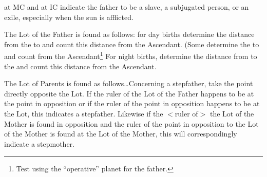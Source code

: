 \Saturn\xspace at MC and \Jupiter\xspace at IC indicate the
father to be a slave, a subjugated person, or an exile, especially when the sun is afflicted.

The Lot of the Father is found as follows: for day births determine the distance from the \Sun\xspace to \Saturn\xspace and count this distance from the Ascendant. (Some determine the \Sun\xspace to \Jupiter\xspace and count from the Ascendant\footnote{Test using the ``operative'' planet for the father.} For night births, determine the distance from \Venus\xspace to the \Moon\xspace and count this distance from the Ascendant. 

The Lot of Parents is found as follows\ldots Concerning a stepfather, take the point directly opposite the Lot. If the ruler of the Lot of the Father happens to be at the point in opposition or if the ruler of the point in opposition happens to be at the Lot, this indicates a stepfather. Likewise if the $<$ruler of$>$ the Lot of the Mother is found in opposition and the ruler of the point in opposition to the Lot of the Mother is found at the Lot of the Mother, this will
correspondingly indicate a stepmother.

\newpage